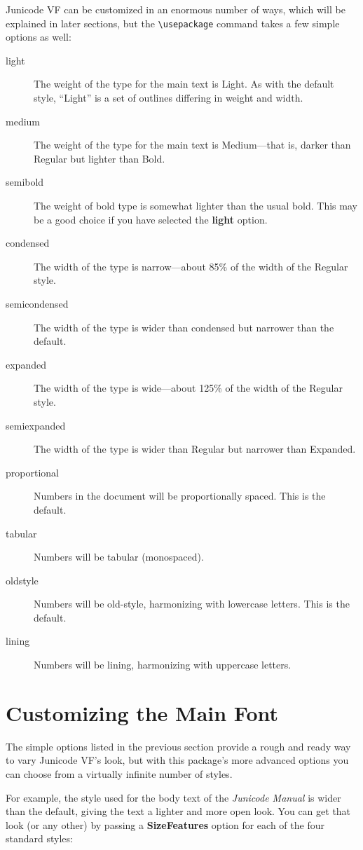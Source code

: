 \documentclass[12pt]{article}
\begin{document}
Junicode VF can be customized in an enormous number of ways, which will be explained
in later sections, but the {\verb|\usepackage|} command takes a few simple options
as well:

\begin{description}
    \item[light] The weight of the type for the main text is Light. As with the default
    style, “Light” is a set of outlines differing in weight and width.
    \item[medium] The weight of the type for the main text is Medium---that is, darker than
    Regular but lighter than Bold.
    \item[semibold] The weight of bold type is somewhat lighter than the usual bold. This may be a
    good choice if you have selected the \textbf{light} option.
    \item[condensed] The width of the type is narrow---about 85\% of the width of the Regular style.
    \item[semicondensed] The width of the type is wider than condensed but narrower than the default.
    \item[expanded] The width of the type is wide---about 125\% of the width of the Regular style.
    \item[semiexpanded] The width of the type is wider than Regular but narrower than Expanded.
    \item[proportional] Numbers in the document will be proportionally spaced. This is the default.
    \item[tabular] Numbers will be tabular (monospaced).
    \item[oldstyle] Numbers will be old-style, harmonizing with lowercase letters. This is the default.
    \item[lining] Numbers will be lining, harmonizing with uppercase letters.
\end{description}

\section{Customizing the Main Font}

The simple options listed in the previous section provide a rough and ready
way to vary Junicode VF's look, but with this package's more advanced options you can choose
from a virtually infinite number of styles.

For example, the style used for the body text of the \textit{Junicode Manual}
is wider than the default, giving the text a lighter and more open look. You
can get that look (or any other) by passing a \textbf{SizeFeatures} option for 
each of the four standard styles:
\end{document}
